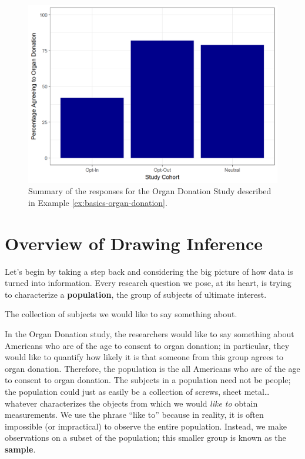 \documentclass[]{book}
\theoremstyle{definition}
\theoremstyle{definition}
\theoremstyle{remark}
\let\BeginKnitrBlock\begin \let\EndKnitrBlock\end
\begin{document}
\begin{figure}

{\centering \includegraphics[width=0.8\linewidth]{./Images/basics-organ-plot-1} 

}

\caption{Summary of the responses for the Organ
Donation Study described in Example \ref{ex:basics-organ-donation}.}\label{fig:basics-organ-plot}
\end{figure}

\section{Overview of Drawing
Inference}\label{overview-of-drawing-inference}

Let's begin by taking a step back and considering the big picture of how
data is turned into information. Every research question we pose, at its
heart, is trying to characterize a \textbf{population}, the group of
subjects of ultimate interest.

\BeginKnitrBlock{definition}[Population]
\protect\hypertarget{def:defn-population}{}{\label{def:defn-population}
{} }The collection of subjects we would like to
say something about.
\EndKnitrBlock{definition}

In the Organ Donation study, the researchers would like to say something
about Americans who are of the age to consent to organ donation; in
particular, they would like to quantify how likely it is that someone
from this group agrees to organ donation. Therefore, the population is
the all Americans who are of the age to consent to organ donation. The
subjects in a population need not be people; the population could just
as easily be a collection of screws, sheet metal\ldots{}whatever
characterizes the objects from which we would \emph{like to} obtain
measurements. We use the phrase ``like to'' because in reality, it is
often impossible (or impractical) to observe the entire population.
Instead, we make observations on a subset of the population; this
smaller group is known as the \textbf{sample}.
\end{document}
